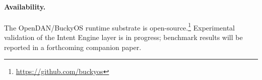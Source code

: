 \documentclass[11pt]{article}
\begin{document}
\paragraph{Availability.}
The OpenDAN/BuckyOS runtime substrate is open-source.\footnote{\url{https://github.com/buckyos}} Experimental validation of the Intent Engine layer is in progress; benchmark results will be reported in a forthcoming companion paper.




\end{document}
